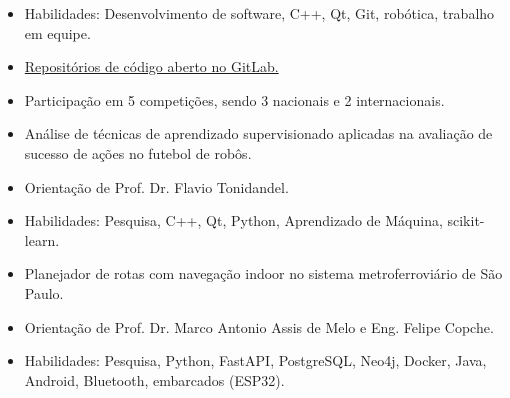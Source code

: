 \documentclass[10pt,a4paper,ragged2e,withhyper]{altacv}
\begin{document}
\begin{paracol}{2}

\begin{itemize}
\item Habilidades: Desenvolvimento de software, C++, Qt, Git, robótica, trabalho em equipe.
\item \href{https://gitlab.com/robofei/ssl}{Repositórios de código aberto no GitLab.}
\item Participação em 5 competições, sendo 3 nacionais e 2 internacionais.
\end{itemize}


\begin{itemize}
\item Análise de técnicas de aprendizado supervisionado aplicadas na avaliação de sucesso de ações no futebol de robôs.
\item Orientação de Prof. Dr. Flavio Tonidandel.
\item Habilidades: Pesquisa, C++, Qt, Python, Aprendizado de Máquina, scikit-learn.
\end{itemize}

\divider

\begin{itemize}
  \item Planejador de rotas com navegação indoor no sistema metroferroviário de São Paulo.
  \item Orientação de Prof. Dr. Marco Antonio Assis de Melo e Eng. Felipe Copche.
  \item Habilidades: Pesquisa, Python, FastAPI, PostgreSQL, Neo4j, Docker, Java, Android, Bluetooth, embarcados (ESP32).
\end{itemize}
  
\medskip




\end{paracol}
\end{document}
